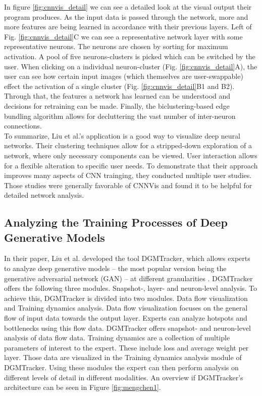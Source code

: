 \documentclass{acmsiggraph}               %
\begin{document}
In figure \ref{fig:cnnvis_detail} we can see a detailed look at the visual output their program produces. As the input data is passed through the network, more and more features are being learned in accordance with their previous layers. Left of Fig. \ref{fig:cnnvis_detail}C we can see a representative network layer with some representative neurons. The neurons are chosen by sorting for maximum activation. A pool of five neurons-clusters is picked which can be switched by the user. When clicking on a individual neuron-cluster (Fig. \ref{fig:cnnvis_detail}A), the user can see how certain input images (which themselves are user-swappable) effect the activation of a single cluster (Fig. \ref{fig:cnnvis_detail}B1 and B2). Through that, the features a network has learned can be understood and decisions for retraining can be made. Finally, the biclustering-based edge bundling algorithm allows for decluttering the vast number of inter-neuron connections.\\

To summarize, Liu et al.'s application is a good way to visualize deep neural networks. Their clustering techniques allow for a stripped-down exploration of a network, where only necessary components can be viewed. User interaction allows for a flexible alteration to specific user needs. To demonstrate that their approach improves many aspects of CNN trainging, they conducted multiple user studies. Those studies were generally favorable of CNNVis and found it to be helpful for detailed network analysis.

\subsection{Analyzing the Training Processes of Deep Generative Models}
In their paper, Liu et al. developed the tool DGMTracker, which allows experts to analyze deep generative models -- the most popular version being the generative adversarial network (GAN) -- at different granularities \cite{Liu2018}. 
DGMTracker offers the following three modules. Snapshot-, layer- and neuron-level analysis.
To achieve this, DGMTracker is divided into two modules. Data flow visualization and Training dynamics analysis.
Data flow visualization focuses on the general flow of input data towards the output layer. Experts can analyze hotspots and bottlenecks using this flow data. DGMTracker offers snapshot- and neuron-level analysis of data flow data.
Training dynamics are a collection of multiple parameters of interest to the expert. These include loss and average weight per layer. Those data are visualized in the Training dynamics analysis module of DGMTracker.
Using these modules the expert can then perform analysis on different levels of detail in different modalities.
An overview if DGMTracker's architecture can be seen in Figure \ref{fig:mengchen1}.
\end{document}
